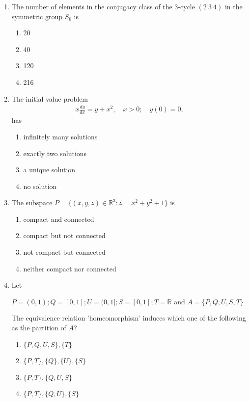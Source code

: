 \documentclass[journal]{IEEEtran}
\numberwithin{equation}{enumi}
\numberwithin{figure}{enumi}
\begin{document}
\begin{enumerate}
\item The number of elements in the conjugacy class of the $3$-cycle $(2\ 3\ 4)$ in the symmetric group $S_6$ is
\hfill{}
\begin{multicols}{4}
\begin{enumerate}
    \item 20
    \item 40
    \item 120
    \item 216
\end{enumerate}
\end{multicols}


\item The initial value problem  
\begin{align*}
x \frac{dy}{dx} = y + x^2, \quad x > 0; \quad y(0) = 0,
\end{align*}
has 
\hfill{}
\begin{multicols}{2}
\begin{enumerate}
    \item infinitely many solutions
    \item exactly two solutions
    \item a unique solution
    \item no solution
\end{enumerate}
\end{multicols}




\item The subspace $P = \{(x,y,z)\in \mathbb{R}^3 : z = x^2 + y^2 + 1\}$ is
\hfill{}
\begin{multicols}{2}
\begin{enumerate}
    \item compact and connected
    \item compact but not connected
    \item not compact but connected 
    \item neither compact nor connected

\end{enumerate}
\end{multicols}


\item Let

$P = (0,1); Q = [0,1]; U = (0,1]; S = [0,1]; T = \mathbb{R}$ and $A = \{P,Q,U,S,T\}$

The equivalence relation 'homeomorphism' induces which one of the following as the partition of $A$?
\hfill{}
\begin{multicols}{2}
\begin{enumerate}
    \item $\{P,Q,U,S\}, \{T\}$
    \item $\{P,T\}, \{Q\}, \{U\}, \{S\}$
    \item $\{P,T\}, \{Q,U,S\}$ 
    \item $\{P,T\}, \{Q,U\}, \{S\}$
\end{enumerate}
\end{multicols}




\end{enumerate}
\end{document}
